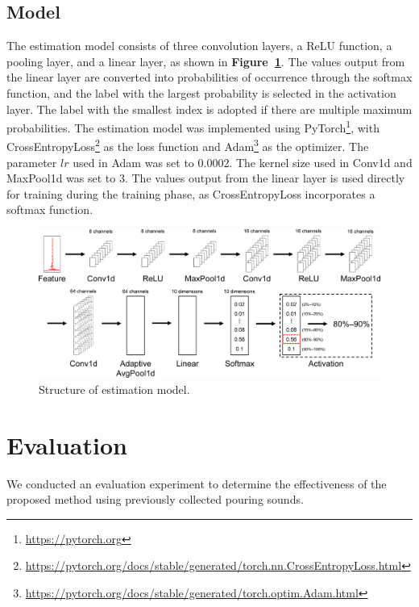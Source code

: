\documentclass[sigconf,authordraft]{acmart}
\newcommand\figref[1]{\textbf{Figure~\ref{fig:#1}}}
\begin{document}
\subsection{Model}
The estimation model consists of three convolution layers, a ReLU function, a pooling layer, and a linear layer, as shown in \figref{model}. The values output from the linear layer are converted into probabilities of occurrence through the softmax function, and the label with the largest probability is selected in the activation layer. The label with the smallest index is adopted if there are multiple maximum probabilities. The estimation model was implemented using PyTorch\footnote{\url{https://pytorch.org}}, with CrossEntropyLoss\footnote{\url{https://pytorch.org/docs/stable/generated/torch.nn.CrossEntropyLoss.html}} as the loss function and Adam\footnote{\url{https://pytorch.org/docs/stable/generated/torch.optim.Adam.html}} as the optimizer. The parameter $lr$ used in Adam was set to 0.0002. The kernel size used in Conv1d and MaxPool1d was set to 3. The values output from the linear layer is used directly for training during the training phase, as CrossEntropyLoss incorporates a softmax function.

\begin{figure}[!t]
  \centering
  \includegraphics[width=0.8\linewidth]{figures/model.eps}
  \caption{Structure of estimation model.}
  \label{fig:model}
\end{figure}



\section{Evaluation}
\label{sec:evaluation}
We conducted an evaluation experiment to determine the effectiveness of the proposed method using previously collected pouring sounds.

\end{document}
